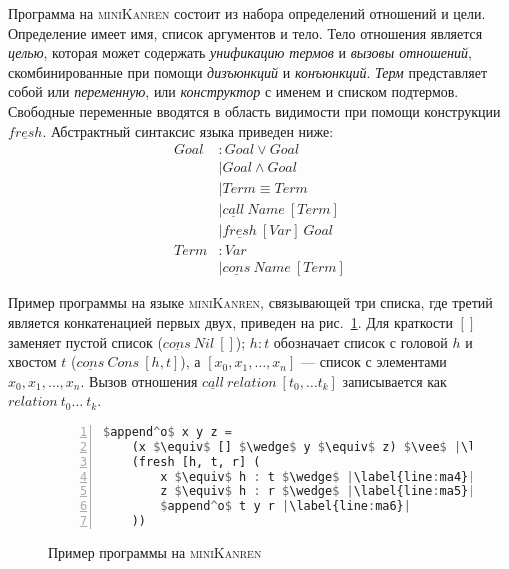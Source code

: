 \documentclass[conference,a4paper,american,russian]{IEEEtran}
\newcommand{\miniKanren}{\textsc{miniKanren}}
\begin{document}
Программа на \miniKanren{} состоит из набора определений отношений и цели.
Определение имеет имя, список аргументов и тело.
Тело отношения является \textit{целью}, которая может содержать \textit{унификацию термов} и \textit{вызовы отношений}, скомбинированные при помощи \textit{дизъюнкций} и \textit{конъюнкций}.
\textit{Терм} представляет собой или \textit{переменную}, или \textit{конструктор} с именем и списком подтермов.
Свободные переменные вводятся в область видимости при помощи конструкции $\underline{fresh}$.
Абстрактный синтаксис языка приведен ниже:
\begin{align*}
  Goal &: Goal \vee Goal \\
       &\mid Goal \wedge Goal \\
       &\mid Term \equiv Term \\
       &\mid \underline{call} \ Name \ [Term] \\
       &\mid \underline{fresh} \ [Var] \ Goal \\
  Term &: Var \\
       &\mid \underline{cons} \ Name \ [Term]
\end{align*}

Пример программы на языке \miniKanren{}, связывающей три списка, где третий является конкатенацией первых двух, приведен на рис.~\ref{lst:appendoDEF}.
Для краткости $[]$ заменяет пустой список ($\underline{cons} \ Nil \ []$); $h : t$ обозначает список с головой $h$ и хвостом $t$ ($\underline{cons} \ Cons \ [h, t]$), а $[x_0, x_1, \dots, x_n]$ --- список с элементами $x_0, x_1, \dots, x_n$.
Вызов отношения $\underline{call} \ relation \ [t_0, \dots t_k]$ записывается как $relation \ t_0 \dots \ t_k$.

\begin{figure}[h!]
  \begin{center}
  \begin{minipage}{0.3\textwidth}
  \begin{lstlisting}[language=Haskell, frame=single, numbers=left,numberstyle=\small, escapechar=|]
  $append^o$ x y z =
    (x $\equiv$ [] $\wedge$ y $\equiv$ z) $\vee$ |\label{line:ma2}|
    (fresh [h, t, r] (
        x $\equiv$ h : t $\wedge$ |\label{line:ma4}|
        z $\equiv$ h : r $\wedge$ |\label{line:ma5}|
        $append^o$ t y r |\label{line:ma6}|
    ))
    \end{lstlisting}
  \end{minipage}
  \end{center}
  \caption{Пример программы на \miniKanren{}}
  \label{lst:appendoDEF}
\end{figure}
\end{document}
